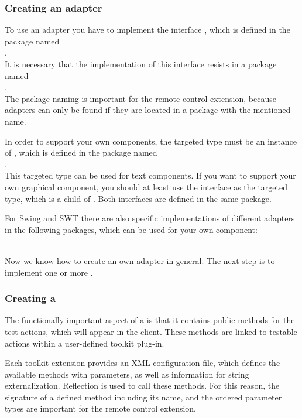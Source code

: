 \subsubsection{Creating an adapter}

To use an adapter you have to implement the interface
, which is defined in the package named\\
.\\
It is necessary that the implementation of this interface resists in a package
named\\
.\\
The package naming is important for the remote control extension, because
adapters can only be found if they are located in a package with the mentioned name.

In order to support your own components, the targeted type must be an instance
of , which is defined in the package named\\
.\\
This targeted type can be used for text components. If you want to support your
own graphical component, you should at least use the interface
 as the targeted type, which is a child of
. Both interfaces are defined in the same package.

For Swing and SWT there are also specific implementations of different
adapters in the following packages, which can be used for your own component:\\
\\

Now we know how to create an own adapter in general. The next step is to
implement one or more \gdtesterclass. 

\subsubsection{Creating a \gdtesterclass}

The functionally important aspect of a \gdtesterclass is that it
contains public methods for the test actions, which will appear in
the client. These methods are linked to testable actions within a user-defined
\ite{} toolkit plug-in.

Each \ite{}  toolkit extension provides an XML configuration file, which defines the
available methods with parameters, as well as information for string
externalization. Reflection is used to call these methods. For this reason, the
signature of a defined method including its name, and the ordered parameter
types are important for the remote control extension.

